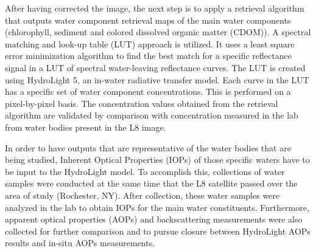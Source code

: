 After having corrected the image, the next step is to apply a retrieval algorithm that outputs water component retrieval maps of the main water components (chlorophyll, { sediment} and colored dissolved organic matter (CDOM)). A spectral matching and look-up table (LUT) approach is utilized. It uses a least square error minimization algorithm to find the best match for a specific reflectance signal in a LUT of spectral water-leaving reflectance curves. The LUT is created using HydroLight 5, an in-water radiative transfer model. Each curve in the LUT has a specific set of water component concentrations. This is performed on a pixel-by-pixel basis. The concentration values obtained from the retrieval algorithm are validated by comparison with concentration measured in the lab from water bodies present in the L8 image.

In order to have outputs that are representative of the water bodies that are being studied, Inherent Optical Properties (IOPs) of those specific waters have to be input to the HydroLight model. To accomplish this, collections of water samples were conducted at the same time that the L8 satellite passed over the area of study (Rochester, NY). After collection, these water samples were analyzed in the lab to obtain IOPs for the main water constituents. Furthermore, apparent optical properties (AOPs) and backscattering measurements were also collected for further comparison and to pursue closure between HydroLight AOPs results and in-situ AOPs measurements.

